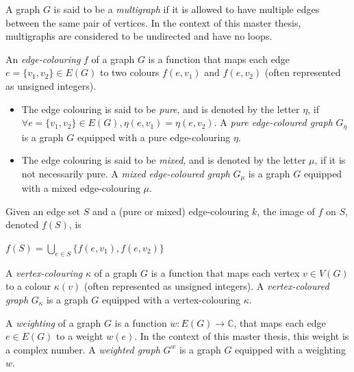 \begin{definition}[Multigraph]
    \label{def:multigraph}
    A graph $G$ is said to be a \textit{multigraph} if it is allowed to have multiple edges between the same pair of vertices.
    In the context of this master thesis, multigraphs are considered to be undirected and have no loops.
\end{definition}

\begin{definition}
    \label{def:edge-coloured-graph}
    An \textit{edge-colouring} $f$ of a graph $G$ is a function that maps each edge $e = \{v_1, v_2\} \in E(G)$ to two colours $f(e, v_1)$ and $f(e, v_2)$ (often represented as unsigned integers).
    \begin{itemize}
        \item The edge colouring is said to be \textit{pure}, and is denoted by the letter $\eta$, if $\forall e = \{v_1, v_2\} \in E(G), \eta(e, v_1) = \eta(e, v_2)$.
            A \textit{pure edge-coloured graph} $G_\eta$ is a graph $G$ equipped with a pure edge-colouring $\eta$.
        \item The edge colouring is said to be \textit{mixed}, and is denoted by the letter $\mu$, if it is not necessarily pure.
            A \textit{mixed edge-coloured graph} $G_\mu$ is a graph $G$ equipped with a mixed edge-colouring $\mu$.
    \end{itemize}
    Given an edge set $S$ and a (pure or mixed) edge-colouring $k$, the image of $f$ on $S$, denoted $f(S)$, is
    \begin{center}
        $f(S) = \bigcup\limits_{e \in S} \{f(e, v_1), f(e, v_2)\}$
    \end{center}
\end{definition}

\begin{definition}
    \label{def:vertex_coloured_graph}
    A \textit{vertex-colouring} $\kappa$ of a graph $G$ is a function that maps each vertex $v \in V(G)$ to a colour $\kappa(v)$ (often represented as unsigned integers).
    A \textit{vertex-coloured graph} $G_\kappa$ is a graph $G$ equipped with a vertex-colouring $\kappa$.
\end{definition}

\begin{definition}
    \label{def:weighted_graph}
    A \textit{weighting} of a graph $G$ is a function $w: E(G) \rightarrow \mathbb{C}$, that maps each edge $e \in E(G)$ to a weight $w(e)$.
    In the context of this master thesis, this weight is a complex number.
    A \textit{weighted graph} $G^w$ is a graph $G$ equipped with a weighting $w$.
\end{definition}

